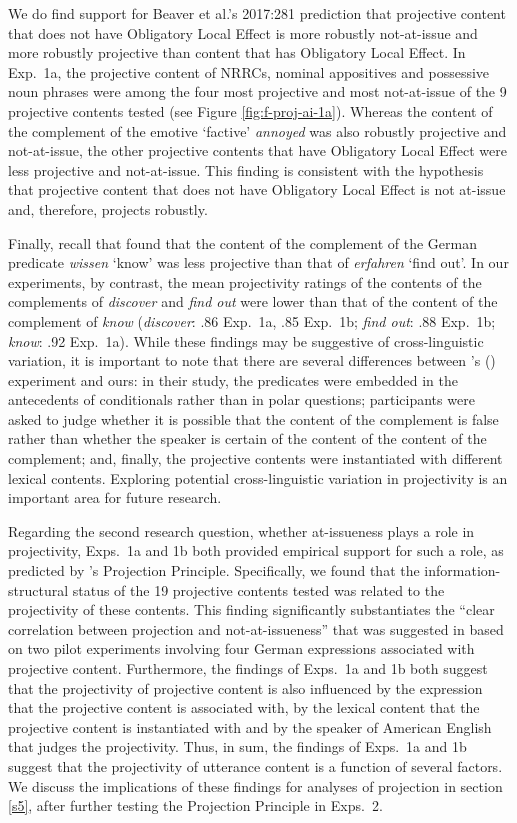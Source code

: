 \documentclass[11pt,fleqn]{article}
\newcommand{\6}{\mbox{$[\hspace*{-.6mm}[$}}
\newcommand{\9}{\mbox{$]\hspace*{-.6mm}]$}}
\newcommand{\citepos}[1]{\citeauthor{#1}'s \citeyear{#1}}
\newcommand{\citetpos}[1]{\citeauthor{#1}'s (\citeyear{#1})}
\begin{document}
We do find support for Beaver et al.'s 2017:281 prediction that projective content that does not have Obligatory Local Effect is more robustly not-at-issue and more robustly projective than content that has Obligatory Local Effect. In Exp.~1a, the projective content of NRRCs, nominal appositives and possessive noun phrases were among the four most projective and most not-at-issue of the 9 projective contents tested (see Figure \ref{fig:f-proj-ai-1a}). Whereas the content of the complement of the emotive `factive' {\em annoyed} was also robustly projective and not-at-issue, the other projective contents that have Obligatory Local Effect were less projective and not-at-issue. This finding is consistent with the hypothesis that projective content that does not have Obligatory Local Effect is not at-issue and, therefore, projects robustly.

Finally, recall that \citet{xue-onea11} found that the content of the complement of the German predicate {\em wissen} `know' was less projective than that of {\em erfahren} `find out'. In our experiments, by contrast, the mean projectivity ratings of the contents of the complements of {\em discover} and {\em find out} were lower  than that of the content of the complement of {\em know} ({\em discover}: .86 Exp.~1a, .85 Exp.~1b; {\em find out}: .88 Exp.~1b; {\em know}: .92 Exp.~1a). While these findings may be suggestive of cross-linguistic variation, it is important to note that there are several differences between \citetpos{xue-onea11} experiment and ours: in their study, the predicates were embedded in the antecedents of conditionals rather than in polar questions; participants were asked to judge whether it is possible that the content of the complement is false rather than whether the speaker is certain of the content of the content of the complement; and, finally, the projective contents were instantiated with different lexical contents. Exploring potential cross-linguistic variation in projectivity is an important area for future research.

Regarding the second research question, whether at-issueness plays a role in projectivity, Exps.~1a and 1b both provided empirical support for such a role, as predicted by  \citepos{brst-ar} Projection Principle. Specifically, we found that the information-structural status of the 19 projective contents tested was related to the projectivity of these contents. This finding significantly substantiates the ``clear correlation between projection and not-at-issueness'' that was suggested in \citealt[180]{xue-onea11} based on two pilot experiments involving four German expressions associated with projective content. Furthermore, the findings of Exps.~1a and 1b both suggest that the projectivity of projective content is also influenced by the expression that the projective content is associated with, by the lexical content that the projective content is instantiated with and by the speaker of American English that judges the projectivity.  Thus, in sum, the findings of Exps.~1a and 1b suggest that the projectivity of utterance content is a function of several factors. We discuss the implications of these findings for analyses of projection in section \ref{s5}, after further testing the Projection Principle in Exps.~2.
\end{document}
